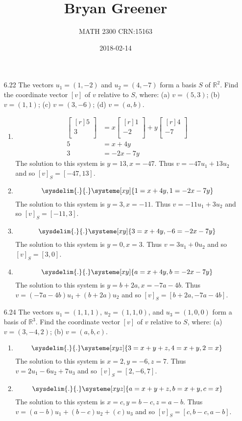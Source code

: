 \documentclass[12pt]{article}
\title{Bryan Greener}
\author{MATH 2300 CRN:15163}
\date{2018-02-14}
\theoremstyle{definition}
\theoremstyle{plain}
\begin{document}
\maketitle

\TabPositions{4cm}

\begin{enumerate}
\item[6.22] The vectors $u_1=(1,-2)$ and $u_2=(4,-7)$ form a basis $S$ of $\mathbb{R}^2$. Find the coordinate vector $[v]$ of $v$ relative to $S$, where: (a) $v=(5,3)$; (b) $v=(1,1)$; (c) $v=(3,-6)$; (d) $v=(a,b)$.
	\begin{enumerate}
	\item 
		\begin{align*}
		\begin{bmatrix}[r]5\\3\\\end{bmatrix} &= x\begin{bmatrix}[r]1\\-2\\\end{bmatrix}+y\begin{bmatrix}[r]4\\-7\\\end{bmatrix}\\
		5&=x+4y\\
		3&=-2x-7y
		\end{align*}
		The solution to this system is $y=13,x=-47$. Thus $v=-47u_1+13u_2$ and so $[v]_S=[-47,13]$.
	\item
		\[ \sysdelim{.}{.}\systeme[xy]{1=x+4y,1=-2x-7y} \]
		The solution to this system is $y=3,x=-11$. Thus $v=-11u_1+3u_2$ and so $[v]_S=[-11,3]$.
	\item
		\[ \sysdelim{.}{.}\systeme[xy]{3=x+4y,-6=-2x-7y} \]
		The solution to this system is $y=0,x=3$. Thus $v=3u_1+0u_2$ and so $[v]_S=[3,0]$.
	\item
		\[ \sysdelim{.}{.}\systeme[xy]{a=x+4y,b=-2x-7y} \]
		The solution to this system is $y=b+2a, x=-7a-4b$. Thus $v=(-7a-4b)u_1+(b+2a)u_2$ and so $[v]_S=[b+2a,-7a-4b]$.
	\end{enumerate}

\pagebreak
\item[6.24] The vectors $u_1=(1,1,1)$, $u_2=(1,1,0)$, and $u_3=(1,0,0)$ form a basis of $\mathbb{R}^3$. Find the coordinate vector $[v]$ of $v$ relative to $S$, where: (a) $v=(3,-4,2)$; (b) $v=(a,b,c)$.
	\begin{enumerate}
	\item
		\[ \sysdelim{.}{.}\systeme[xyz]{3=x+y+z, \-4=x+y,2=x} \]
		The solution to this system is $x=2,y=-6,z=7$. Thus $v=2u_1-6u_2+7u_3$ and so $[v]_S=[2,-6,7]$.
	\item
		\[ \sysdelim{.}{.}\systeme[xyz]{a=x+y+z,b=x+y,c=x} \]
		The solution to this system is $x=c, y=b-c, z=a-b$. Thus $v=(a-b)u_1+(b-c)u_2+(c)u_3$ and so $[v]_S=[c,b-c,a-b]$.
	\end{enumerate}
	

\end{enumerate}
\end{document}
